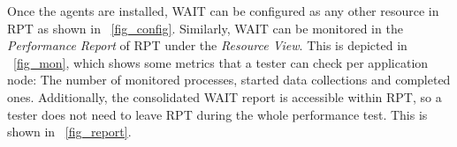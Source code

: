 \documentclass[runningheads,a4paper]{llncs}
\begin{document}
Once the agents are installed, WAIT can be configured as
any other resource in RPT as shown in \figurename ~\ref{fig_config}. Similarly,
WAIT can be monitored in the \emph{Performance Report} of RPT
under the \emph{Resource View}. This is depicted in \figurename ~\ref{fig_mon},
which shows some metrics that a tester can check per application node: The
number of monitored processes, started data collections and completed ones.
Additionally, the consolidated WAIT report is accessible within RPT, so a tester
does not need to leave RPT during the whole performance test. This is shown in \figurename ~\ref{fig_report}. 

\vspace{-5pt}
\end{document}
